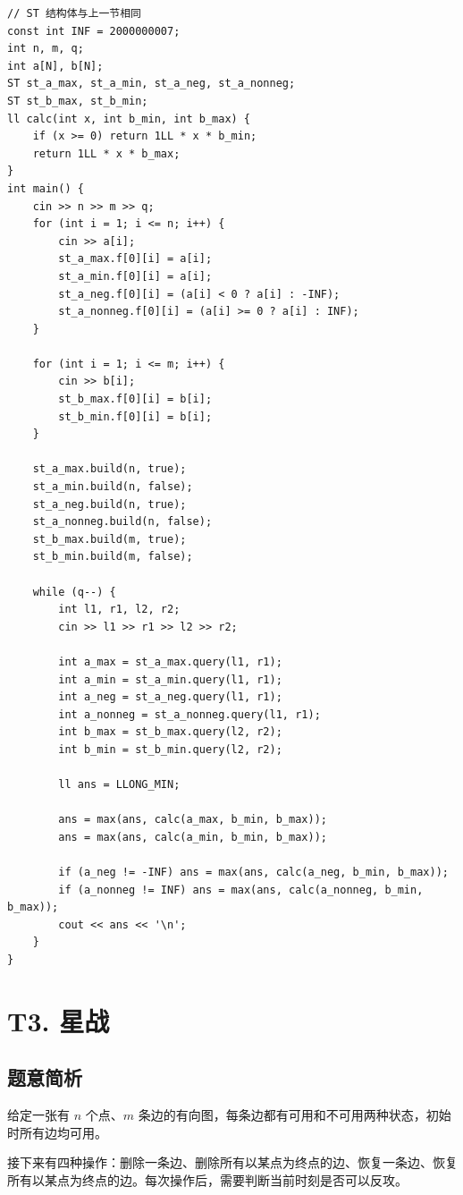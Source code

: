 \documentclass{book}
\begin{document}
\begin{lstlisting}[style = code]
// ST 结构体与上一节相同
const int INF = 2000000007;
int n, m, q;
int a[N], b[N];
ST st_a_max, st_a_min, st_a_neg, st_a_nonneg;
ST st_b_max, st_b_min;
ll calc(int x, int b_min, int b_max) {
    if (x >= 0) return 1LL * x * b_min;
    return 1LL * x * b_max;
}
int main() {
    cin >> n >> m >> q;
    for (int i = 1; i <= n; i++) {
        cin >> a[i];
        st_a_max.f[0][i] = a[i];
        st_a_min.f[0][i] = a[i];
        st_a_neg.f[0][i] = (a[i] < 0 ? a[i] : -INF);
        st_a_nonneg.f[0][i] = (a[i] >= 0 ? a[i] : INF);
    }

    for (int i = 1; i <= m; i++) {
        cin >> b[i];
        st_b_max.f[0][i] = b[i];
        st_b_min.f[0][i] = b[i];
    }

    st_a_max.build(n, true);
    st_a_min.build(n, false);
    st_a_neg.build(n, true);
    st_a_nonneg.build(n, false);
    st_b_max.build(m, true);
    st_b_min.build(m, false);

    while (q--) {
        int l1, r1, l2, r2;
        cin >> l1 >> r1 >> l2 >> r2;

        int a_max = st_a_max.query(l1, r1);
        int a_min = st_a_min.query(l1, r1);
        int a_neg = st_a_neg.query(l1, r1);
        int a_nonneg = st_a_nonneg.query(l1, r1);
        int b_max = st_b_max.query(l2, r2);
        int b_min = st_b_min.query(l2, r2);

        ll ans = LLONG_MIN;

        ans = max(ans, calc(a_max, b_min, b_max));
        ans = max(ans, calc(a_min, b_min, b_max));

        if (a_neg != -INF) ans = max(ans, calc(a_neg, b_min, b_max));
        if (a_nonneg != INF) ans = max(ans, calc(a_nonneg, b_min, b_max));
        cout << ans << '\n';
    }
}
\end{lstlisting}
\newpage

\section{T3. 星战}

\subsection{题意简析}

给定一张有 $n$ 个点、$m$ 条边的有向图，每条边都有可用和不可用两种状态，初始时所有边均可用。

接下来有四种操作：删除一条边、删除所有以某点为终点的边、恢复一条边、恢复所有以某点为终点的边。每次操作后，需要判断当前时刻是否可以反攻。
\end{document}
